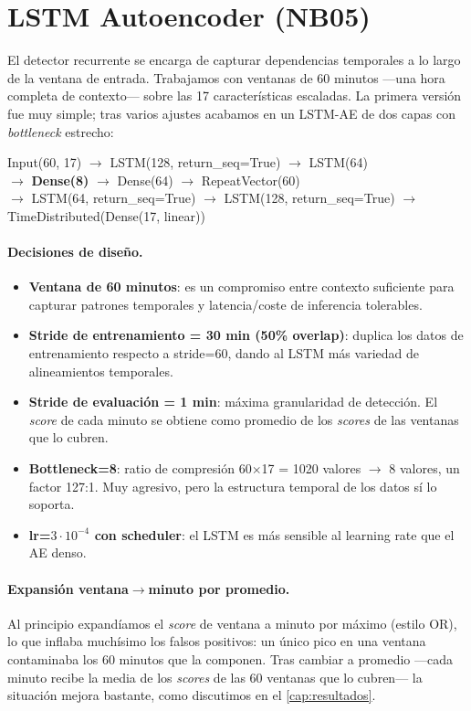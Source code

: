 \section{LSTM Autoencoder (NB05)}
\label{sec:nb05}

El detector recurrente se encarga de capturar dependencias temporales a lo largo de la ventana de entrada. Trabajamos con ventanas de 60 minutos ---una hora completa de contexto--- sobre las 17 características escaladas. La primera versión fue muy simple; tras varios ajustes acabamos en un LSTM-AE de dos capas con \textit{bottleneck} estrecho:

\begin{center}
\textsf{Input(60, 17)} $\to$ LSTM(128, return\_seq=True) $\to$ LSTM(64) \\
$\to$ \textbf{Dense(8)} $\to$ Dense(64) $\to$ RepeatVector(60) \\
$\to$ LSTM(64, return\_seq=True) $\to$ LSTM(128, return\_seq=True) $\to$ TimeDistributed(Dense(17, linear))
\end{center}

\paragraph{Decisiones de diseño.}
\begin{itemize}[leftmargin=*,topsep=0pt]
  \item \textbf{Ventana de 60 minutos}: es un compromiso entre contexto suficiente para capturar patrones temporales y latencia/coste de inferencia tolerables.
  \item \textbf{Stride de entrenamiento = 30 min (50\% overlap)}: duplica los datos de entrenamiento respecto a stride=60, dando al LSTM más variedad de alineamientos temporales.
  \item \textbf{Stride de evaluación = 1 min}: máxima granularidad de detección. El \emph{score} de cada minuto se obtiene como promedio de los \emph{scores} de las ventanas que lo cubren.
  \item \textbf{Bottleneck=8}: ratio de compresión 60$\times$17 = 1020 valores $\to$ 8 valores, un factor 127:1. Muy agresivo, pero la estructura temporal de los datos sí lo soporta.
  \item \textbf{lr=$3\cdot 10^{-4}$ con scheduler}: el LSTM es más sensible al learning rate que el AE denso.
\end{itemize}

\paragraph{Expansión ventana$\to$minuto por promedio.} Al principio expandíamos el \textit{score} de ventana a minuto por máximo (estilo OR), lo que inflaba muchísimo los falsos positivos: un único pico en una ventana contaminaba los 60 minutos que la componen. Tras cambiar a promedio ---cada minuto recibe la media de los \textit{scores} de las 60 ventanas que lo cubren--- la situación mejora bastante, como discutimos en el \cref{cap:resultados}.

